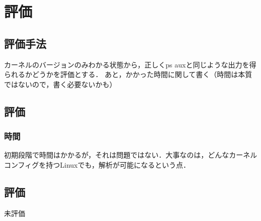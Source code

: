 \chapter{評価}
\label{chap:evaluation}

\section{評価手法}

カーネルのバージョンのみわかる状態から，正しくps auxと同じような出力を得られるかどうかを評価とする．
あと，かかった時間に関して書く（時間は本質ではないので，書く必要ないかも）

\section{評価}

\subsection{時間}

初期段階で時間はかかるが，それは問題ではない．大事なのは，どんなカーネルコンフィグを持つLinuxでも，解析が可能になるという点．

\section{評価}

未評価
